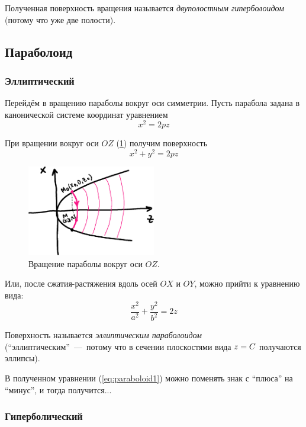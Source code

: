 \documentclass[a4paper,12pt]{article}
\begin{document}
  Полученная поверхность вращения называется \emph{двуполостным гиперболоидом} (потому что уже две полости).
  
  
  \subsection{Параболоид}
  
  \subsubsection{Эллиптический}
  
  Перейдём в вращению параболы вокруг оси симметрии.
  Пусть парабола задана в канонической системе координат уравнением
  \[
    x^2 = 2pz
  \]
  
  При вращении вокруг оси $OZ$ (\ref{fig:parabola-rotate-1}) получим поверхность
  \[
    x^2 + y^2 = 2pz
  \]
  
  \begin{figure}[h]
    \centering

    \includegraphics[width=0.5\textwidth]{parabola-rotate-1}
  
    \caption{Вращение параболы вокруг оси $OZ$.}
    \label{fig:parabola-rotate-1}
  \end{figure}
  
  Или, после сжатия-растяжения вдоль осей $OX$ и $OY$, можно прийти к уравнению вида:
  \begin{equation}
    \label{eq:paraboloid1}
    \boxed{
      \frac{x^2}{a^2} + \frac{y^2}{b^2} = 2z
    }
  \end{equation}
  
  Поверхность называется \emph{эллиптическим параболоидом} (``эллиптическим''~---~потому что в сечении плоскостями вида $z \hm= C$ получаются эллипсы).
  
  В полученном уравнении (\ref{eq:paraboloid1}) можно поменять знак с ``плюса'' на ``минус'', и тогда получится...
  
  
  \subsubsection{Гиперболический}
  
\end{document}
